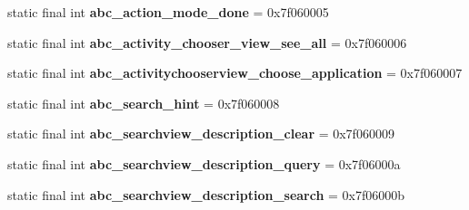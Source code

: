 \begin{DoxyCompactItemize}
\item 
\hypertarget{classandroid_1_1support_1_1v7_1_1appcompat_1_1_r_1_1string_ab47aea7d6f590078f9b103b739084828}{}static final int {\bfseries abc\+\_\+action\+\_\+mode\+\_\+done} = 0x7f060005\label{classandroid_1_1support_1_1v7_1_1appcompat_1_1_r_1_1string_ab47aea7d6f590078f9b103b739084828}

\item 
\hypertarget{classandroid_1_1support_1_1v7_1_1appcompat_1_1_r_1_1string_a251b3261b9f1bd9fe85117e02d81d6a8}{}static final int {\bfseries abc\+\_\+activity\+\_\+chooser\+\_\+view\+\_\+see\+\_\+all} = 0x7f060006\label{classandroid_1_1support_1_1v7_1_1appcompat_1_1_r_1_1string_a251b3261b9f1bd9fe85117e02d81d6a8}

\item 
\hypertarget{classandroid_1_1support_1_1v7_1_1appcompat_1_1_r_1_1string_a90f4fe7b227c4fbf744928e926fbea60}{}static final int {\bfseries abc\+\_\+activitychooserview\+\_\+choose\+\_\+application} = 0x7f060007\label{classandroid_1_1support_1_1v7_1_1appcompat_1_1_r_1_1string_a90f4fe7b227c4fbf744928e926fbea60}

\item 
\hypertarget{classandroid_1_1support_1_1v7_1_1appcompat_1_1_r_1_1string_a8a977c43ae9b6036b792a424d60ff3ed}{}static final int {\bfseries abc\+\_\+search\+\_\+hint} = 0x7f060008\label{classandroid_1_1support_1_1v7_1_1appcompat_1_1_r_1_1string_a8a977c43ae9b6036b792a424d60ff3ed}

\item 
\hypertarget{classandroid_1_1support_1_1v7_1_1appcompat_1_1_r_1_1string_a458a8ba55dea450ed52e936d7fbb4312}{}static final int {\bfseries abc\+\_\+searchview\+\_\+description\+\_\+clear} = 0x7f060009\label{classandroid_1_1support_1_1v7_1_1appcompat_1_1_r_1_1string_a458a8ba55dea450ed52e936d7fbb4312}

\item 
\hypertarget{classandroid_1_1support_1_1v7_1_1appcompat_1_1_r_1_1string_a687a6a0f890080c34188b0570f1ad557}{}static final int {\bfseries abc\+\_\+searchview\+\_\+description\+\_\+query} = 0x7f06000a\label{classandroid_1_1support_1_1v7_1_1appcompat_1_1_r_1_1string_a687a6a0f890080c34188b0570f1ad557}

\item 
\hypertarget{classandroid_1_1support_1_1v7_1_1appcompat_1_1_r_1_1string_adb0d54ee3eeb2609de19decfc0831c19}{}static final int {\bfseries abc\+\_\+searchview\+\_\+description\+\_\+search} = 0x7f06000b\label{classandroid_1_1support_1_1v7_1_1appcompat_1_1_r_1_1string_adb0d54ee3eeb2609de19decfc0831c19}


\end{DoxyCompactItemize}
